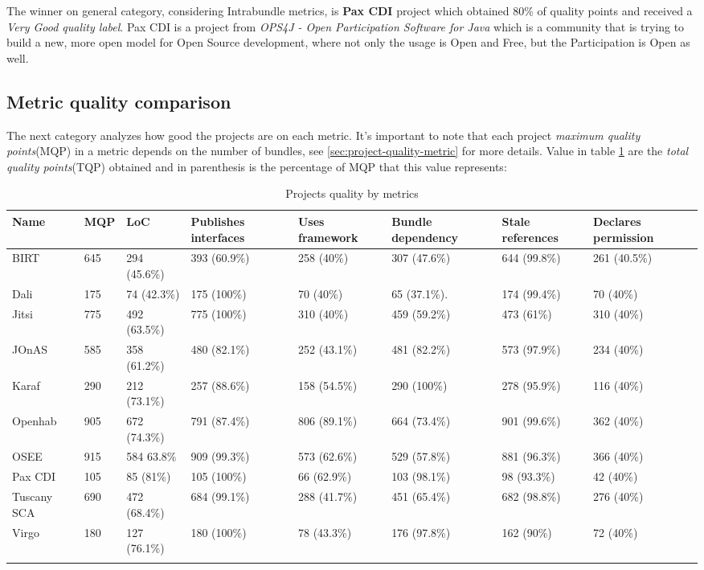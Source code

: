 The winner on general category, considering Intrabundle metrics, is \textbf{Pax CDI} project which obtained 80\% of quality points and received a \emph{Very Good quality label}. Pax CDI is a project from \emph{OPS4J - Open Participation Software for Java} which is a community that is trying to build a new, more open model for Open Source development, where not only the usage is Open and Free, but the Participation is Open as well. 

\subsection{Metric quality comparison}

The next category analyzes how good the projects are on each metric. It's important to note that each project \emph{maximum quality points}(MQP) in a metric depends on the number of bundles, see \ref{sec:project-quality-metric} for more details. Value in table \ref{projects-metrics-quality} are the \emph{total quality points}(TQP) obtained and in parenthesis is the percentage of MQP that this value represents:  

\begin{table}[h]
\tiny
\caption{Projects quality by metrics}
\label{projects-metrics-quality}
    \begin{tabular}{  p{3cm} | p{2cm} | p{2cm} | p{2cm} | p{2cm} | p{2cm} | p{2cm} | p{2cm} }
    \Xhline{2\arrayrulewidth}
    Name & MQP & LoC & Publishes interfaces & Uses framework & Bundle dependency & Stale references & Declares permission \\  \hline
    BIRT & 645 & 294 (45.6\%) & 393 (60.9\%) & 258 (40\%) & 307 (47.6\%) & 644 (99.8\%) & 261 (40.5\%)\\ \hline
    Dali & 175 & 74 (42.3\%) & 175 (100\%) & 70 (40\%) & 65 (37.1\%). & 174 (99.4\%) & 70 (40\%)\\ \hline
    Jitsi & 775 & 492 (63.5\%) & 775 (100\%) & 310 (40\%) & 459 (59.2\%) & 473 (61\%) & 310 (40\%)\\ \hline
    JOnAS & 585 & 358 (61.2\%) & 480 (82.1\%) & 252 (43.1\%) & 481 (82.2\%) & 573 (97.9\%) & 234 (40\%)\\ \hline
    Karaf & 290 & 212 (73.1\%) & 257 (88.6\%) & 158 (54.5\%) &  290 (100\%) & 278 (95.9\%) & 116 (40\%)\\ \hline
    Openhab & 905 & 672 (74.3\%)& 791 (87.4\%) & 806 (89.1\%)&  664 (73.4\%) & 901 (99.6\%) & 362 (40\%)\\ \hline
    OSEE & 915 & 584 63.8\% & 909 (99.3\%) & 573 (62.6\%) & 529 (57.8\%) & 881 (96.3\%) & 366 (40\%)\\ \hline
    Pax CDI & 105 & 85 (81\%) & 105 (100\%) & 66 (62.9\%) & 103 (98.1\%) & 98 (93.3\%) & 42 (40\%) \\ \hline
    Tuscany SCA & 690 & 472 (68.4\%) & 684 (99.1\%) & 288 (41.7\%) & 451 (65.4\%) &  682 (98.8\%) & 276 (40\%) \\ \hline
    Virgo & 180 & 127 (76.1\%) & 180 (100\%) & 78 (43.3\%) & 176 (97.8\%) & 162 (90\%) & 72 (40\%)\\
   \Xhline{2\arrayrulewidth}
    \end{tabular}
\end{table}
\FloatBarrier   

